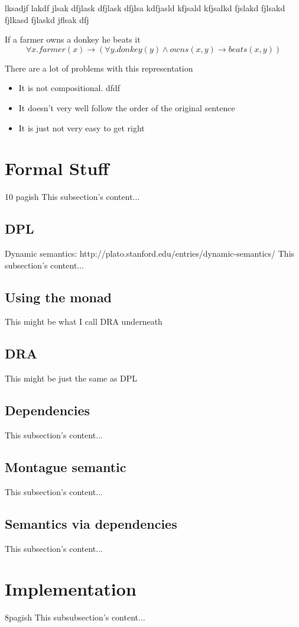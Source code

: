 \documentclass[12pt]{article}
\let\stdsection\section
\renewcommand\section{\newpage\stdsection}
\begin{document}
lksadjf lakdf jlsak dfjlask dfjlask dfjlsa kdfjasld kfjsald kfjsalkd fjslakd fjlsakd fjlkasd fjlaskd jflsak dfj

If a farmer owns a donkey he beats it
\begin{equation}
\forall x . farmer(x) \rightarrow (\forall y . donkey(y) \wedge owns(x,y) \rightarrow beats(x,y))
\end{equation}

There are a lot of problems with this representation
\begin{itemize}
  \item It is not compositional. 
  dfdf
  \item It doesn't very well follow the order of the original sentence
  \item It is just not very easy to get right
\end{itemize}

\section{Formal Stuff}
10 pagish
This subsection's content...
\subsection{DPL}
Dynamic semantics: http://plato.stanford.edu/entries/dynamic-semantics/
This subsection's content...
\subsection{Using the monad}
This might be what I call DRA underneath
\subsection{DRA}
This might be just the same as DPL
\subsection{Dependencies}
This subsection's content...
\subsection{Montague semantic}
This subsection's content...
\subsection{Semantics via dependencies}
This subsection's content...

\section{Implementation}
8pagish
This subsubsection's content...
\end{document}
